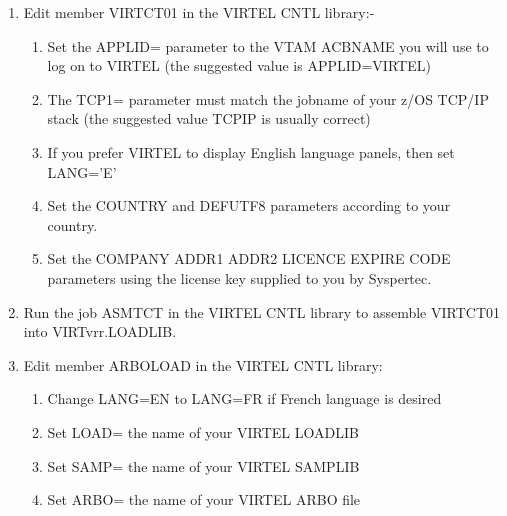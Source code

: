 \documentclass[letterpaper,10pt,english]{sphinxmanual}
\begin{document}
\begin{sphinxVerbatim}[commandchars=\\\{\}]
 
\end{sphinxVerbatim}
\begin{enumerate}
%
\setcounter{enumi}{6}
\item {} 
Edit member VIRTCT01 in the VIRTEL CNTL library:-
\begin{enumerate}
%
\item {} 
Set the APPLID= parameter to the VTAM ACBNAME you will use to log on to VIRTEL (the suggested value is APPLID=VIRTEL)

\item {} 
The TCP1= parameter must match the jobname of your z/OS TCP/IP stack (the suggested value TCPIP is usually correct)

\item {} 
If you prefer VIRTEL to display English language panels, then set LANG=’E’

\item {} 
Set the COUNTRY and DEFUTF8 parameters according to your country.

\item {} 
Set the COMPANY ADDR1 ADDR2 LICENCE EXPIRE CODE parameters using the license key supplied to you by Syspertec.

\end{enumerate}

\item {} 
Run the job ASMTCT in the VIRTEL CNTL library to assemble VIRTCT01 into VIRTvrr.LOADLIB.

\item {} 
Edit member ARBOLOAD in the VIRTEL CNTL library:
\begin{enumerate}
%
\item {} 
Change LANG=EN to LANG=FR if French language is desired

\item {} 
Set LOAD= the name of your VIRTEL LOADLIB

\item {} 
Set SAMP= the name of your VIRTEL SAMPLIB

\item {} 
Set ARBO= the name of your VIRTEL ARBO file


\end{enumerate}
\end{enumerate}
\end{document}
